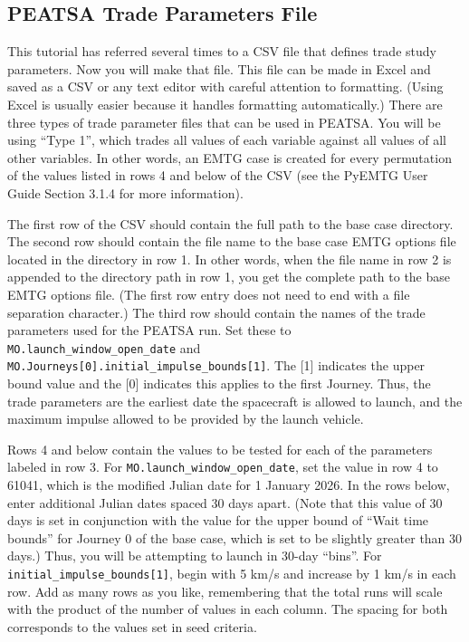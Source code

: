 \documentclass[11pt]{article}
\begin{document}
\subsection{PEATSA Trade Parameters File}
\label{sec:peatsa_trade_parameters_file}

This tutorial has referred several times to a CSV file that defines trade study parameters. Now you will make that file. This file can be made in Excel and saved as a CSV or any text editor with careful attention to formatting. (Using Excel is usually easier because it handles formatting automatically.) There are three types of trade parameter files that can be used in \ac{PEATSA}. You will be using ``Type 1'', which trades all values of each variable against all values of all other variables. In other words, an \ac{EMTG} case is created for every permutation of the values listed in rows 4 and below of the CSV (see the PyEMTG User Guide Section 3.1.4 for more information).

\noindent The first row of the CSV should contain the full path to the base case directory. The second row should contain the file name to the base case \ac{EMTG} options file located in the directory in row 1. In other words, when the file name in row 2 is appended to the directory path in row 1, you get the complete path to the base \ac{EMTG} options file. (The first row entry does not need to end with a file separation character.) The third row should contain the names of the trade parameters used for the \ac{PEATSA} run. Set these to \texttt{MO.launch\_window\_open\_date} and \texttt{MO.Journeys[0].initial\_impulse\_bounds[1]}. The [1] indicates the upper bound value and the [0] indicates this applies to the first Journey. Thus, the trade parameters are the earliest date the spacecraft is allowed to launch, and the maximum impulse allowed to be provided by the launch vehicle.

\noindent Rows 4 and below contain the values to be tested for each of the parameters labeled in row 3. For \texttt{MO.launch\_window\_open\_date}, set the value in row 4 to 61041, which is the modified Julian date for 1 January 2026. In the rows below, enter additional Julian dates spaced 30 days apart. (Note that this value of 30 days is set in conjunction with the value for the upper bound of ``Wait time bounds'' for Journey 0 of the base case, which is set to be slightly greater than 30 days.) Thus, you will be attempting to launch in 30-day ``bins''. For \texttt{initial\_impulse\_bounds[1]}, begin with 5 km/s and increase by 1 km/s in each row. Add as many rows as you like, remembering that the total runs will scale with the product of the number of values in each column. The spacing for both corresponds to the values set in seed criteria. 
\end{document}
